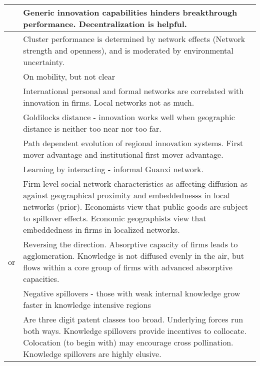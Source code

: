 \documentclass[12pt]{article}
\begin{document}
\begin{center}
\begin{longtable}{|p{}|p{}|}
\cite*{Dunlap-Hinkler2010} & Generic innovation capabilities hinders breakthrough performance. Decentralization is helpful.\\\hline

\cite*{Eisingerich2010} & Cluster performance is determined by network effects (Network strength and openness), and is moderated by environmental uncertainty.\\\hline

\cite*{Eriksson2011} & On mobility, but not clear\\\hline

\cite*{Fitjar2015} & International personal and formal networks are correlated with innovation in firms. Local networks not as much. \\\hline

\cite*{Fitjar2016} & Goldilocks distance - innovation works well when geographic distance is neither too near nor too far.\\\hline

\cite*{Fu2012} & Path dependent evolution of regional innovation systems. First mover advantage and institutional first mover advantage.\\\hline

\cite*{Fu2013} & Learning by interacting - informal Guanxi network.\\\hline

\cite*{Giuliani2007} & Firm level social network characteristics as affecting diffusion as against geographical proximity and embeddednesss in local networks (prior). Economists view that public goods are subject to spillover effects. Economic geographists view that embeddedness in firms in localized networks.\\\hline

\cite*{Giuliani2005b} or \cite*{Giuliani2005a} & Reversing the direction. Absorptive capacity of firms leads to agglomeration.  Knowledge is not diffused evenly in the air, but flows within a core group of firms with advanced absorptive capacities.\\\hline

\cite*{Grillitsch2017} & Negative spillovers - those with weak internal knowledge  grow faster in knowledge intensive regions\\\hline

\cite*{Henderson2005} & Are three digit patent classes too broad. Underlying forces run both ways. Knowledge spillovers provide incentives to collocate. Colocation (to begin with) may encourage cross pollination. Knowledge spillovers are highly elusive.\\\hline


\end{longtable}
\end{center}
\end{document}
